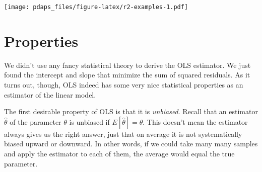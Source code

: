 \documentclass[
  12pt,
  oneside,openany]{book}
\begin{document}
\texttt{[image: pdaps\_files/figure-latex/r2-examples-1.pdf]}

\hypertarget{properties}{%
\section{Properties}\label{properties}}

We didn't use any fancy statistical theory to derive the OLS estimator. We just found the intercept and slope that minimize the sum of squared residuals. As it turns out, though, OLS indeed has some very nice statistical properties as an estimator of the linear model.

The first desirable property of OLS is that it is \emph{unbiased}. Recall that an estimator \(\hat{\theta}\) of the parameter \(\theta\) is unbiased if \(E[\hat{\theta}] = \theta\). This doesn't mean the estimator always gives us the right answer, just that on average it is not systematically biased upward or downward. In other words, if we could take many many samples and apply the estimator to each of them, the average would equal the true parameter.
\end{document}
